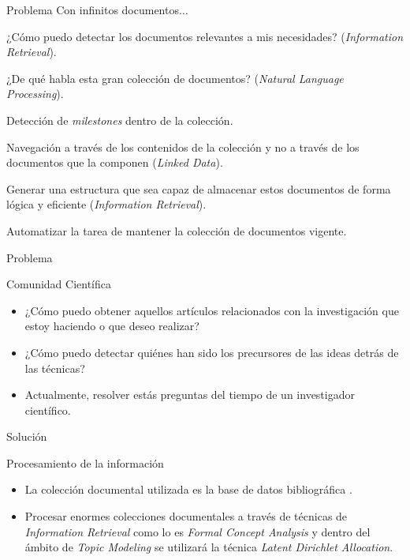 \begin{tframe}{Problema}
	Con infinitos documentos$\ldots$
	\begin{disadv}
		\item ¿Cómo puedo detectar los documentos relevantes a mis necesidades? (\emph{Information Retrieval}).
		\item ¿De qué habla esta gran colección de documentos? (\emph{Natural Language Processing}).
		\item Detección de \emph{milestones} dentro de la colección.
		\item Navegación a través de los contenidos de la colección y no a través de los documentos que la componen (\emph{Linked Data}).
		\item Generar una estructura que sea capaz de almacenar estos documentos de forma lógica y eficiente (\emph{Information Retrieval}).
		\item Automatizar la tarea de mantener la colección de documentos vigente.
	\end{disadv}
\end{tframe}

\begin{tframe}{Problema}
	\begin{block}{Comunidad Científica}
		\begin{itemize}
			\item ¿Cómo puedo obtener aquellos artículos relacionados con la investigación que estoy haciendo o que deseo realizar?
			\item ¿Cómo puedo detectar quiénes han sido los precursores de las ideas detrás de las técnicas?
			\item Actualmente, resolver estás preguntas  del tiempo de un investigador científico.
		\end{itemize}
	\end{block}
\end{tframe}

\begin{frame}[c]{Solución}
	\begin{block}{Procesamiento de la información}
		\begin{itemize}
			\item La colección documental utilizada es la base de datos bibliográfica .
			\item Procesar enormes colecciones documentales a través de técnicas de \emph{Information Retrieval} como lo es \emph{Formal Concept Analysis} y dentro del ámbito de \emph{Topic Modeling} se utilizará la técnica \emph{Latent Dirichlet Allocation}.
		\end{itemize}
	\end{block}
\end{frame}

